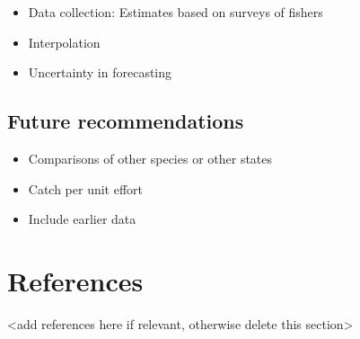 \documentclass[
  12pt,
]{article}
\providecommand{\tightlist}{%
  \setlength{\itemsep}{0pt}\setlength{\parskip}{0pt}}
\begin{document}
\begin{itemize}
\tightlist
\item
  Data collection: Estimates based on surveys of fishers
\item
  Interpolation
\item
  Uncertainty in forecasting
\end{itemize}

\hypertarget{future-recommendations}{%
\subsection{Future recommendations}\label{future-recommendations}}

\begin{itemize}
\tightlist
\item
  Comparisons of other species or other states
\item
  Catch per unit effort
\item
  Include earlier data
\end{itemize}

\newpage

\hypertarget{references}{%
\section{References}\label{references}}

\textless add references here if relevant, otherwise delete this
section\textgreater{}
\end{document}
